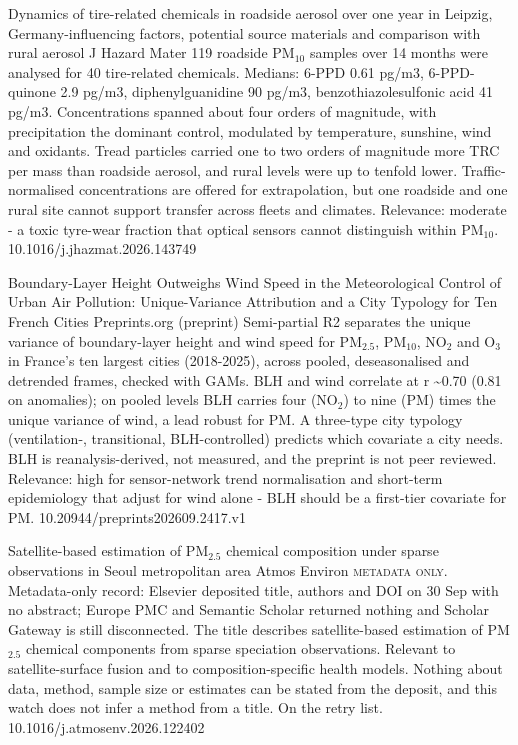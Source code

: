 \documentclass[10pt]{article}
\begin{document}
{Dynamics of tire-related chemicals in roadside aerosol over one year in Leipzig, Germany-influencing factors, potential source materials and comparison with rural aerosol}
{J Hazard Mater}
{119 roadside PM$_{10}$ samples over 14 months were analysed for 40 tire-related chemicals. Medians: 6-PPD 0.61 pg/m3, 6-PPD-quinone 2.9 pg/m3, diphenylguanidine 90 pg/m3, benzothiazolesulfonic acid 41 pg/m3. Concentrations spanned about four orders of magnitude, with precipitation the dominant control, modulated by temperature, sunshine, wind and oxidants. Tread particles carried one to two orders of magnitude more TRC per mass than roadside aerosol, and rural levels were up to tenfold lower. Traffic-normalised concentrations are offered for extrapolation, but one roadside and one rural site cannot support transfer across fleets and climates. Relevance: moderate - a toxic tyre-wear fraction that optical sensors cannot distinguish within PM$_{10}$.}
{10.1016/j.jhazmat.2026.143749}

{Boundary-Layer Height Outweighs Wind Speed in the Meteorological Control of Urban Air Pollution: Unique-Variance Attribution and a City Typology for Ten French Cities}
{Preprints.org (preprint)}
{Semi-partial R2 separates the unique variance of boundary-layer height and wind speed for PM$_{2.5}$, PM$_{10}$, NO$_2$ and O$_3$ in France's ten largest cities (2018-2025), across pooled, deseasonalised and detrended frames, checked with GAMs. BLH and wind correlate at r \textasciitilde{}0.70 (0.81 on anomalies); on pooled levels BLH carries four (NO$_2$) to nine (PM) times the unique variance of wind, a lead robust for PM. A three-type city typology (ventilation-, transitional, BLH-controlled) predicts which covariate a city needs. BLH is reanalysis-derived, not measured, and the preprint is not peer reviewed. Relevance: high for sensor-network trend normalisation and short-term epidemiology that adjust for wind alone - BLH should be a first-tier covariate for PM.}
{10.20944/preprints202609.2417.v1}

{Satellite-based estimation of PM$_{2.5}$ chemical composition under sparse observations in Seoul metropolitan area}
{Atmos Environ}
{\textsc{metadata only.} Metadata-only record: Elsevier deposited title, authors and DOI on 30 Sep with no abstract; Europe PMC and Semantic Scholar returned nothing and Scholar Gateway is still disconnected. The title describes satellite-based estimation of PM$_{2.5}$ chemical components from sparse speciation observations. Relevant to satellite-surface fusion and to composition-specific health models. Nothing about data, method, sample size or estimates can be stated from the deposit, and this watch does not infer a method from a title. On the retry list.}
{10.1016/j.atmosenv.2026.122402}
\end{document}

